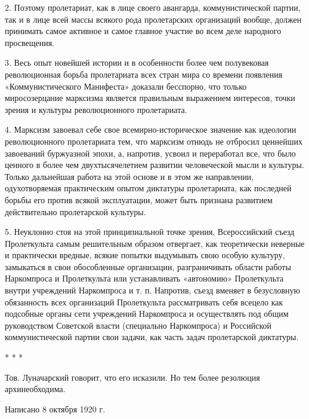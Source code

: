 \documentclass[12pt]{article}
\begin{document}
2. Поэтому пролетариат, как в лице своего авангарда, коммунистической партии, так и в лице всей массы всякого рода пролетарских организаций вообще, должен принимать самое активное и самое главное участие во всем деле народного просвещения.

3. Весь опыт новейшей истории и в особенности более чем полувековая революционная борьба пролетариата всех стран мира со времени появления «Коммунистического Манифеста» доказали бесспорно, что только миросозерцание марксизма является правильным выражением интересов, точки зрения и культуры революционного пролетариата.

4. Марксизм завоевал себе свое всемирно-историческое значение как идеологии революционного пролетариата тем, что марксизм отнюдь не отбросил ценнейших завоеваний буржуазной эпохи, а, напротив, усвоил и переработал все, что было ценного в более чем двухтысячелетием развитии человеческой мысли и культуры. Только дальнейшая работа на этой основе и в этом же направлении, одухотворяемая практическим опытом диктатуры пролетариата, как последней борьбы его против всякой эксплуатации, может быть признана развитием действительно пролетарской культуры.

5. Неуклонно стоя на этой принципиальной точке зрения, Всероссийский съезд Пролеткульта самым решительным образом отвергает, как теоретически неверные и практически вредные, всякие попытки выдумывать свою особую культуру, замыкаться в свои обособленные организации, разграничивать области работы Наркомпроса и Пролеткульта или устанавливать «автономию» Пролеткульта внутри учреждений Наркомпроса и т. п. Напротив, съезд вменяет в безусловную обязанность всех организаций Пролеткульта рассматривать себя всецело как подсобные органы сети учреждений Наркомпроса и осуществлять под общим руководством Советской власти (специально Наркомпроса) и Российской коммунистической партии свои задачи, как часть задач пролетарской диктатуры.

* * *

Тов. Луначарский говорит, что его исказили. Но тем более резолюция архинеобходима.

Написано 8 октября 1920 г.
\end{document}
